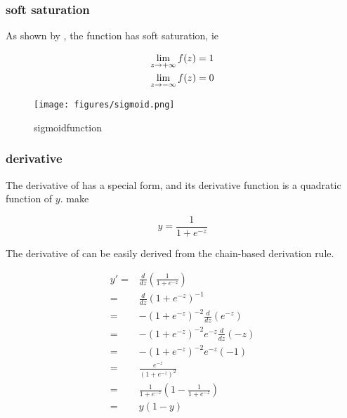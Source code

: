 \begin{content}
\subsubsection{soft saturation}

As shown by , the  function has soft saturation, ie

\[\begin{gathered}
  \mathop {\lim }\limits_{z \to + \infty } f(z) = 1 \hfill \\
  \mathop {\lim }\limits_{z \to - \infty } f(z) = 0 \hfill \\ 
\end{gathered} \]

\begin{figure}[H]
\centering
\texttt{[image: figures/sigmoid.png]}
\caption{sigmoidfunction}
 \label{fig:sigmoid}
\end{figure}

\subsubsection{derivative}

The derivative of  has a special form, and its derivative function is a quadratic function of $y$. make

\[
y = \frac{1}{{1 + {e^{ - z}}}}
\]

The derivative of  can be easily derived from the chain-based derivation rule.

\[\begin{aligned}
  y' = & \frac{d}{{dz}}\left( {\frac{1}{{1 + {e^{ - z}}}}} \right) \\ 
   = & \frac{d}{{dz}}{\left( {1 + {e^{ - z}}} \right)^{ - 1}} \\ 
   = & - {\left( {1 + {e^{ - z}}} \right)^{ - 2}}\frac{d}{{dz}}\left( {{e^{ - z}} } \right) \\ 
   = & - {\left( {1 + {e^{ - z}}} \right)^{ - 2}}{e^{ - z}}\frac{d}{{dz}}\left( { - z} \right) \\ 
   = & - {\left( {1 + {e^{ - z}}} \right)^{ - 2}}{e^{ - z}}\left( { - 1} \right) \\ 
   = & \frac{{{e^{ - z}}}}{{{{\left( {1 + {e^{ - z}}} \right)}^2}}} \\ 
   = & \frac{1}{{1 + {e^{ - z}}}}\left( {1 - \frac{1}{{1 + {e^{ - z}}}}} \right) \\ 
   = & y(1 - y) \\ 
\end{aligned} \]


\end{content}
